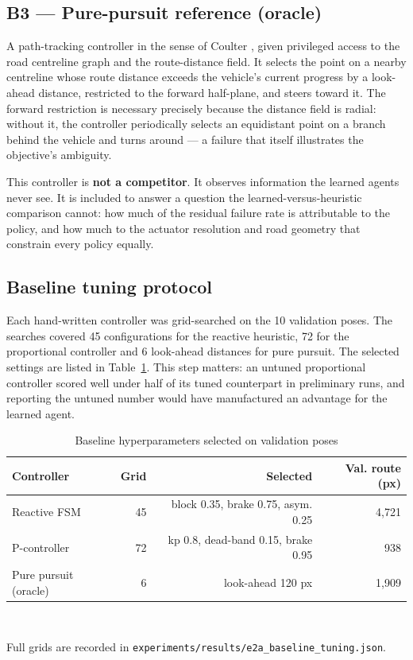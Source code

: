 \documentclass[conference]{IEEEtran}
\begin{document}
\subsection{B3 — Pure-pursuit reference (oracle)}

A path-tracking controller in the sense of Coulter \cite{coulter}, given privileged access to the road centreline graph and the route-distance field. It selects the point on a nearby centreline whose route distance exceeds the vehicle's current progress by a look-ahead distance, restricted to the forward half-plane, and steers toward it. The forward restriction is necessary precisely because the distance field is radial: without it, the controller periodically selects an equidistant point on a branch behind the vehicle and turns around — a failure that itself illustrates the objective's ambiguity.

This controller is \textbf{not a competitor}. It observes information the learned agents never see. It is included to answer a question the learned-versus-heuristic comparison cannot: how much of the residual failure rate is attributable to the policy, and how much to the actuator resolution and road geometry that constrain every policy equally.

\subsection{Baseline tuning protocol}

Each hand-written controller was grid-searched on the 10 validation poses. The searches covered 45 configurations for the reactive heuristic, 72 for the proportional controller and 6 look-ahead distances for pure pursuit. The selected settings are listed in Table~\ref{tab:tuning}. This step matters: an untuned proportional controller scored well under half of its tuned counterpart in preliminary runs, and reporting the untuned number would have manufactured an advantage for the learned agent.

\begin{table}[!t]
\caption{Baseline hyperparameters selected on validation poses}
\label{tab:tuning}
\centering
\footnotesize
\begin{tabular}{lrrr}
\toprule
Controller & Grid & Selected & Val. route (px) \\
\midrule
Reactive FSM & 45 & block 0.35, brake 0.75, asym. 0.25 & 4,721 \\
P-controller & 72 & kp 0.8, dead-band 0.15, brake 0.95 & 938 \\
Pure pursuit (oracle) & 6 & look-ahead 120 px & 1,909 \\
\bottomrule
\end{tabular}
\\[2pt]\parbox{\linewidth}{\scriptsize Full grids are recorded in \texttt{experiments/results/e2a\_baseline\_tuning.json}.}
\end{table}
\end{document}
